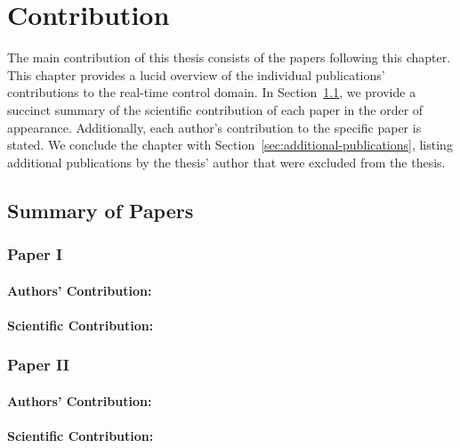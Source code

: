 \chapter{Contribution}

The main contribution of this thesis consists of the  papers following this chapter.
This chapter provides a lucid overview of the individual publications' contributions to the real-time control domain.
In Section~\ref{sec:paper-summaries}, we provide a succinct summary of the scientific contribution of each paper in the order of appearance.
Additionally, each author's contribution to the specific paper is stated.
We conclude the chapter with Section~\ref{sec:additional-publications}, listing additional publications by the thesis' author that were excluded from the thesis.

\section{Summary of Papers}%
\label{sec:paper-summaries}%
%
\subsection*{Paper I}%
%
\begin{quote}
\end{quote}

\subsubsection*{Authors' Contribution:}%
%
\subsubsection*{Scientific Contribution:}%
%

\subsection*{Paper II}%
%
\begin{quote}
\end{quote}

\subsubsection*{Authors' Contribution:}%
%
\subsubsection*{Scientific Contribution:}%
%

